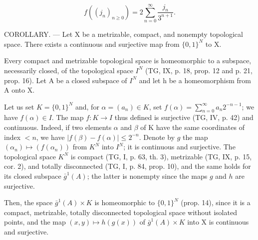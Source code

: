 \[
f ((j _ {n}) _ {n \geqslant 0}) = 2 \sum_ {n = 0} ^ {\infty} \frac {j _ {n}}{3 ^ {n + 1}}.
\]

COROLLARY. --- Let X be a metrizable, compact, and nonempty topological space. There exists a continuous and surjective map from \(\{0,1\}^{N}\) to X.

Every compact and metrizable topological space is homeomorphic to a subspace, necessarily closed, of the topological space \(I^{N}\) (TG, IX, p. 18, prop. 12 and p. 21, prop. 16). Let A be a closed subspace of \(I^{N}\) and let h be a homeomorphism from A onto X.

Let us set \(K = \{0,1\}^{N}\) and, for \(\alpha = (a_n) \in K\), set \(f(\alpha) = \sum_{n=0}^{\infty} a_n 2^{-n-1}\); we have \(f(\alpha) \in I\). The map \(f: K \to I\) thus defined is surjective (TG, IV, p. 42) and continuous. Indeed, if two elements \(\alpha\) and \(\beta\) of K have the same coordinates of index \(< n\), we have \(|f(\beta) - f(\alpha)| \leqslant 2^{-n}\). Denote by \(g\) the map \((\alpha_n) \mapsto (f(\alpha_n))\) from \(K^N\) into \(I^N\); it is continuous and surjective. The topological space \(K^N\) is compact (TG, I, p. 63, th. 3), metrizable (TG, IX, p. 15, cor. 2), and totally disconnected (TG, I, p. 84, prop. 10), and the same holds for its closed subspace \(\bar{g}^{1}(A)\); the latter is nonempty since the maps \(g\) and \(h\) are surjective.

Then, the space \(\bar{g}^{1}(A) \times K\) is homeomorphic to \(\{0,1\}^{N}\) (prop. 14), since it is a compact, metrizable, totally disconnected topological space without isolated points, and the map \((x,y) \mapsto h(g(x))\) of \(\bar{g}^{1}(A) \times K\) into X is continuous and surjective.

